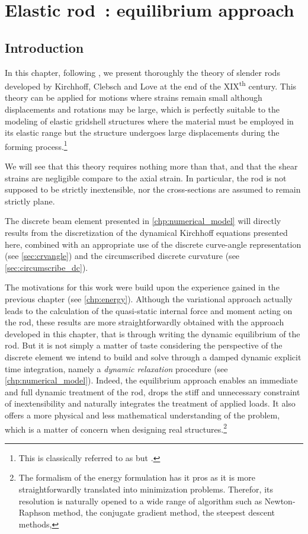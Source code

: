 
\chapter{Elastic rod~: equilibrium approach}
\label{chp:kirchhoff}

\section{Introduction}

In this chapter, following , we present thoroughly the theory of slender rods developed by Kirchhoff, Clebsch and Love at the end of the XIX\textsuperscript{th} century. This theory can be applied for motions where strains remain small although displacements and rotations may be large, which is perfectly suitable to the modeling of elastic gridshell structures where the material must be employed in its elastic range but the structure undergoes large displacements during the forming process.\footnote{This is classically referred to as  but .}

We will see that this theory requires nothing more than that, and that the shear strains are negligible compare to the axial strain. In particular, the rod is not supposed to be strictly inextensible, nor the cross-sections are assumed to remain strictly plane.

The discrete beam element presented in \cref{chp:numerical_model} will directly results from the discretization of the dynamical Kirchhoff equations presented here, combined with an appropriate use of the discrete curve-angle representation (see \cref{sec:crvangle}) and the circumscribed discrete curvature (see \cref{sec:circumscribe_dc}).

The motivations for this work were build upon the experience gained in the previous chapter (see \cref{chp:energy}). Although the variational approach actually leads to the calculation of the quasi-static internal force and moment acting on the rod, these results are more straightforwardly obtained with the approach developed in this chapter, that is through writing the dynamic equilibrium of the rod. But it is not simply a matter of taste considering the perspective of the discrete element we intend to build and solve through a damped dynamic explicit time integration, namely a \emph{dynamic relaxation} procedure (see \cref{chp:numerical_model}). Indeed, the equilibrium approach enables an immediate and full dynamic treatment of the rod, drops the stiff and unnecessary constraint of inextensibility and naturally integrates the treatment of applied loads. It also offers a more physical and less mathematical understanding of the problem, which is a matter of concern when designing real structures.\footnote{The formalism of the energy formulation has it pros as it is more straightforwardly translated into minimization problems. Therefor, its resolution is naturally opened to a wide range of algorithm such as Newton-Raphson method, the conjugate gradient method, the steepest descent methods, \telp{}}

